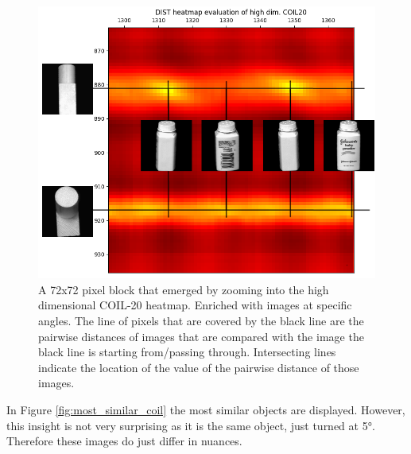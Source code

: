 \begin{figure}[!]
	\centering
	\includegraphics[width=1\columnwidth]{images/dist_heatmap_high_coil20_wooden_bottle_anal.png}
	\caption[Heatmap of Wooden Piece vs. Powder Bottle]{A 72x72 pixel block that emerged by zooming into the high dimensional COIL-20 heatmap. Enriched with images at specific angles. The line of pixels that are covered by the black line are the pairwise distances of images that are compared with the image the black line is starting from/passing through. Intersecting lines indicate the location of the value of the pairwise distance of those images.}
    \label{fig:dist_heatmap_high_coil20_wooden_bottle_anal}
\end{figure}

In Figure \ref{fig:most_similar_coil} the most similar objects are displayed. However, this insight is not very surprising as it is the same object, just turned at 5°. Therefore these images do just differ in nuances.

